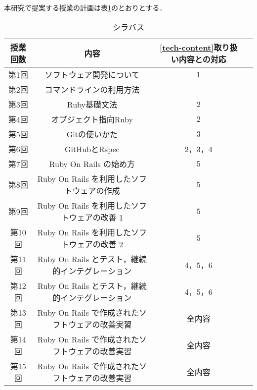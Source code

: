 本研究で提案する授業の計画は表\ref{tab:シラバス}のとおりとする．

\begin{table}[H]
    \caption{シラバス}
    \begin{tabular}{|c|c|c|c|}
      \hline
      授業回数 & 内容 & \ref{tech-content}取り扱い内容との対応 \\%
      \hline
      第1回 & ソフトウェア開発について & 1 \\%
      \hline
      第2回 & コマンドラインの利用方法 &  \\%
      \hline
      第3回 & Ruby基礎文法 &  2 \\%
      \hline
      第4回 & オブジェクト指向Ruby & 2 \\%
      \hline
      第5回 & Gitの使いかた & 3 \\%
      \hline
      第6回 & GitHubとRspec & 2，3，4 \\%
      \hline
      第7回 & Ruby On Rails の始め方 & 5 \\%
      \hline
      第8回 & Ruby On Rails を利用したソフトウェアの作成 & 5 \\%
      \hline
      第9回 & Ruby On Rails を利用したソフトウェアの改善 1 & 5 \\%
      \hline
      第10回 & Ruby On Rails を利用したソフトウェアの改善 2 & 5 \\%
      \hline
      第11回 & Ruby On Rails とテスト，継続的インテグレーション & 4，5，6 \\%
      \hline
      第12回 & Ruby On Rails とテスト，継続的インテグレーション & 4，5，6 \\%
      \hline
      第13回 & Ruby On Rails で作成されたソフトウェアの改善実習 & 全内容 \\%
      \hline
      第14回 & Ruby On Rails で作成されたソフトウェアの改善実習 & 全内容 \\%
      \hline
      第15回 & Ruby On Rails で作成されたソフトウェアの改善実習 & 全内容 \\%
      \hline
    \end{tabular}
    \label{tab:シラバス}
\end{table}

